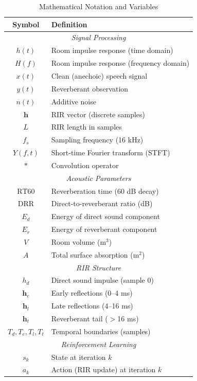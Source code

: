\documentclass[12pt,a4paper]{article}
\begin{document}
\begin{table}[h]
\centering
\caption{Mathematical Notation and Variables}
\label{tab:notation}
\small
\begin{tabular}{cl}
\toprule
\textbf{Symbol} & \textbf{Definition} \\
\midrule
\multicolumn{2}{c}{\textit{Signal Processing}} \\
\midrule
$h(t)$ & Room impulse response (time domain) \\
$H(f)$ & Room impulse response (frequency domain) \\
$x(t)$ & Clean (anechoic) speech signal \\
$y(t)$ & Reverberant observation \\
$n(t)$ & Additive noise \\
$\mathbf{h}$ & RIR vector (discrete samples) \\
$L$ & RIR length in samples \\
$f_s$ & Sampling frequency (16 kHz) \\
$Y(f,t)$ & Short-time Fourier transform (STFT) \\
$*$ & Convolution operator \\
\midrule
\multicolumn{2}{c}{\textit{Acoustic Parameters}} \\
\midrule
$\text{RT60}$ & Reverberation time (60 dB decay) \\
$\text{DRR}$ & Direct-to-reverberant ratio (dB) \\
$E_d$ & Energy of direct sound component \\
$E_r$ & Energy of reverberant component \\
$V$ & Room volume (m$^3$) \\
$A$ & Total surface absorption (m$^2$) \\
\midrule
\multicolumn{2}{c}{\textit{RIR Structure}} \\
\midrule
$h_d$ & Direct sound impulse (sample 0) \\
$\mathbf{h}_e$ & Early reflections (0--4 ms) \\
$\mathbf{h}_l$ & Late reflections (4--16 ms) \\
$\mathbf{h}_t$ & Reverberant tail ($>$16 ms) \\
$T_d, T_e, T_l, T_t$ & Temporal boundaries (samples) \\
\midrule
\multicolumn{2}{c}{\textit{Reinforcement Learning}} \\
\midrule
$s_k$ & State at iteration $k$ \\
$a_k$ & Action (RIR update) at iteration $k$ \\

\end{tabular}
\end{table}
\end{document}
